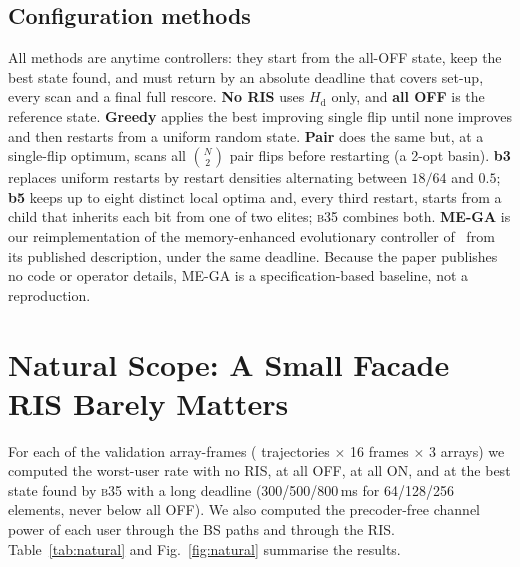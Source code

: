 \documentclass[runningheads]{llncs}
\newcommand{\bthreefive}{\textsc{b35}}
\newcommand{\Hd}{H_{\mathrm{d}}}
\begin{document}
\subsection{Configuration methods}
All methods are anytime controllers: they start from the all-OFF state, keep the best state found, and must return by an absolute deadline that covers set-up, every scan and a final full rescore.
\textbf{No RIS} uses $\Hd$ only, and \textbf{all OFF} is the reference state. \textbf{Greedy} applies the best improving single flip until none improves and then restarts from a uniform random state. \textbf{Pair} does the same but, at a single-flip optimum, scans all $\binom N2$ pair flips before restarting (a 2-opt basin). \textbf{b3} replaces uniform restarts by restart densities alternating between $18/64$ and $0.5$; \textbf{b5} keeps up to eight distinct local optima and, every third restart, starts from a child that inherits each bit from one of two elites; \bthreefive{} combines both. \textbf{ME-GA} is our reimplementation of the memory-enhanced evolutionary controller of~\cite{zardi2024memory} from its published description, under the same deadline. Because the paper publishes no code or operator details, ME-GA is a specification-based baseline, not a reproduction.

\section{Natural Scope: A Small Facade RIS Barely Matters}\label{sec:natural}
For each of the  validation array-frames ( trajectories $\times$ 16 frames $\times$ 3 arrays) we computed the worst-user rate with no RIS, at all OFF, at all ON, and at the best state found by \bthreefive{} with a long deadline (300/500/800\,ms for 64/128/256 elements, never below all OFF). We also computed the precoder-free channel power of each user through the BS paths and through the RIS. Table~\ref{tab:natural} and Fig.~\ref{fig:natural} summarise the results.
\end{document}

